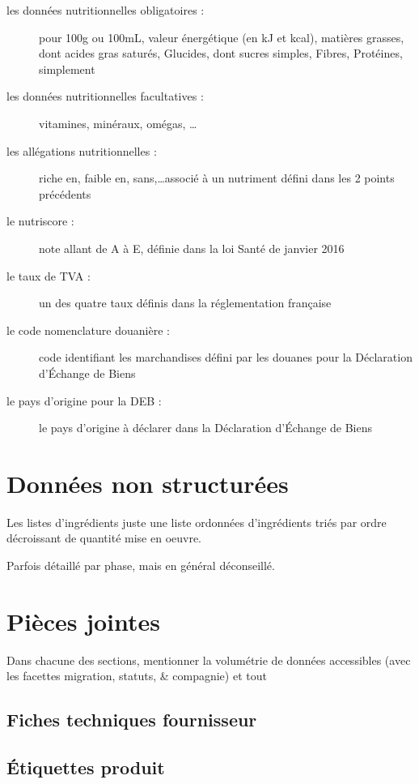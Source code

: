 \begin{description}
            \item[les données nutritionnelles obligatoires :] pour 100g ou 100mL, valeur énergétique (en kJ et kcal), matières grasses, dont acides gras saturés, Glucides, dont sucres simples, Fibres, Protéines, simplement
            \item[les données nutritionnelles facultatives :] vitamines, minéraux, omégas, \dots
            \item[les allégations nutritionnelles :] riche en, faible en, sans,\dots associé à un nutriment défini dans les 2 points précédents
            \item[le nutriscore :] note allant de A à E, définie dans la loi Santé de janvier 2016
            \item[le taux de TVA :] un des quatre taux définis dans la réglementation française
            \item[le code nomenclature douanière :] code identifiant les marchandises défini par les douanes pour la Déclaration d'\'{E}change de Biens~\cite{notions_DEB}
            \item[le pays d'origine pour la DEB :] le pays d'origine à déclarer dans la Déclaration d'\'{E}change de Biens~\cite{notions_DEB}
            \item[] 
        \end{description}
        
        
        \section{Données non structurées}
        
        Les listes d'ingrédients juste une liste ordonnées d'ingrédients triés par ordre décroissant de quantité mise en oeuvre.

        Parfois détaillé par phase, mais en général déconseillé.
        \section{Pièces jointes}
            \label{pieces_jointes}

            Dans chacune des sections, mentionner la volumétrie de données accessibles (avec les facettes migration, statuts, \& compagnie) et tout

            \subsection{Fiches techniques fournisseur}
            \subsection{\'{E}tiquettes produit}
